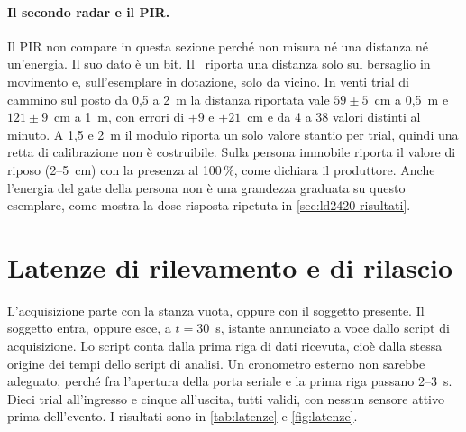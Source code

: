 \paragraph{Il secondo radar e il PIR.} Il PIR non compare in questa sezione perché
non misura né una distanza né un'energia. Il suo dato è un bit. Il \ldc\ riporta una
distanza solo sul bersaglio in movimento e, sull'esemplare in dotazione, solo da
vicino. In venti trial di cammino sul posto da 0,5 a 2~m la distanza riportata vale
$59 \pm 5$~cm a 0,5~m e $121 \pm 9$~cm a 1~m, con errori di $+9$ e $+21$~cm e da 4 a
38 valori distinti al minuto. A 1,5 e 2~m il modulo riporta un solo valore stantio per
trial, quindi una retta di calibrazione non è costruibile. Sulla persona immobile
riporta il valore di riposo (2--5~cm) con la presenza al 100\,\%, come dichiara il
produttore. Anche l'energia del gate della persona non è una grandezza graduata su
questo esemplare, come mostra la dose-risposta ripetuta in \cref{sec:ld2420-risultati}.

\section{Latenze di rilevamento e di rilascio}
\label{sec:latenza}
\label{sec:rilascio}

L'acquisizione parte con la stanza vuota, oppure con il soggetto presente. Il
soggetto entra, oppure esce, a $t = 30$~s, istante annunciato a voce dallo script di
acquisizione. Lo script conta dalla prima riga di dati ricevuta, cioè dalla stessa
origine dei tempi dello script di analisi. Un cronometro esterno non sarebbe adeguato,
perché fra l'apertura della porta seriale e la prima riga passano 2--3~s. Dieci trial
all'ingresso e cinque all'uscita, tutti validi, con nessun sensore attivo prima
dell'evento. I risultati sono in \cref{tab:latenze} e \cref{fig:latenze}.

